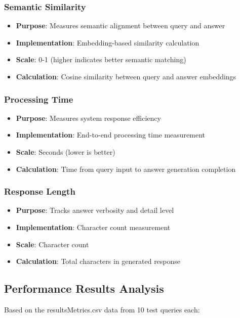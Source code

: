 \documentclass[12pt,a4paper]{article}
\begin{document}
\subsubsection{Semantic Similarity}
\begin{itemize}
    \item \textbf{Purpose}: Measures semantic alignment between query and answer
    \item \textbf{Implementation}: Embedding-based similarity calculation
    \item \textbf{Scale}: 0-1 (higher indicates better semantic matching)
    \item \textbf{Calculation}: Cosine similarity between query and answer embeddings
\end{itemize}

\subsubsection{Processing Time}
\begin{itemize}
    \item \textbf{Purpose}: Measures system response efficiency
    \item \textbf{Implementation}: End-to-end processing time measurement
    \item \textbf{Scale}: Seconds (lower is better)
    \item \textbf{Calculation}: Time from query input to answer generation completion
\end{itemize}

\subsubsection{Response Length}
\begin{itemize}
    \item \textbf{Purpose}: Tracks answer verbosity and detail level
    \item \textbf{Implementation}: Character count measurement
    \item \textbf{Scale}: Character count
    \item \textbf{Calculation}: Total characters in generated response
\end{itemize}

\subsection{Performance Results Analysis}

Based on the resultsMetrics.csv data from 10 test queries each:
\end{document}
